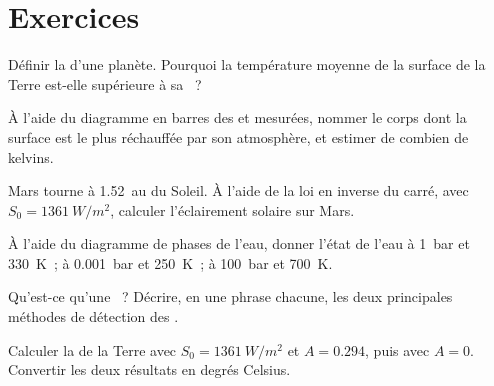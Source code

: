 \section{Exercices}

\begin{exercise}[$\star$]\label{exo:g10:habitable-planet:1}
Définir la  d'une planète. Pourquoi la température
moyenne de la surface de la Terre est-elle supérieure à sa ~?
\end{exercise}

\begin{exercise}[$\star$]\label{exo:g10:habitable-planet:2}
À l'aide du diagramme en barres des  et mesurées,
nommer le corps dont la surface est le plus réchauffée par son atmosphère,
et estimer de combien de kelvins.
\end{exercise}

\begin{exercise}[$\star$]\label{exo:g10:habitable-planet:3}
Mars tourne à \qty{1.52}{au} du Soleil. À l'aide de la loi en inverse du
carré, avec $S_0 = \qty{1361}{W/m^2}$, calculer l'éclairement solaire sur
Mars.
\end{exercise}

\begin{exercise}[$\star$]\label{exo:g10:habitable-planet:4}
À l'aide du diagramme de phases de l'eau, donner l'état de l'eau à
\qty{1}{bar} et \qty{330}{K}~; à \qty{0.001}{bar} et \qty{250}{K}~; à
\qty{100}{bar} et \qty{700}{K}.
\end{exercise}

\begin{exercise}[$\star$]\label{exo:g10:habitable-planet:5}
Qu'est-ce qu'une ~? Décrire, en une phrase chacune, les deux
principales méthodes de détection des .
\end{exercise}

\begin{exercise}[$\star\star$]\label{exo:g10:habitable-planet:6}
Calculer la  de la Terre avec
$S_0 = \qty{1361}{W/m^2}$ et $A = 0.294$, puis avec $A = 0$. Convertir les
deux résultats en degrés Celsius.
\end{exercise}


